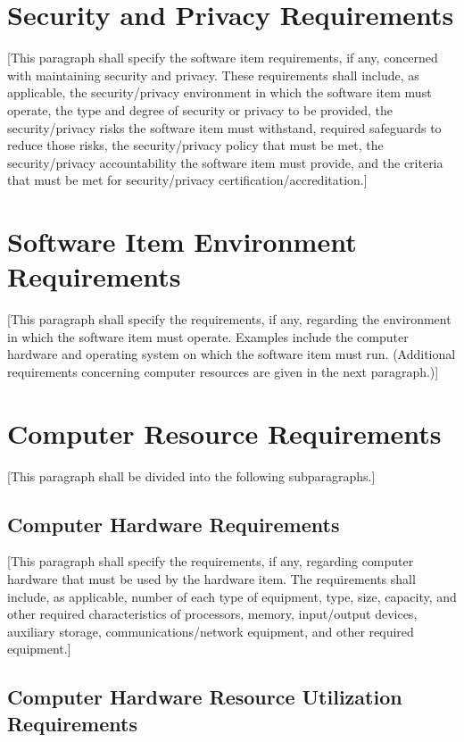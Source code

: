 \section{Security and Privacy Requirements\label{ref-016}}

[This paragraph shall specify the software item requirements, if any, concerned with maintaining security and privacy. These requirements shall include, as applicable, the security/privacy environment in which the software item must operate, the type and degree of security or privacy to be provided, the security/privacy risks the software item must withstand, required safeguards to reduce those risks, the security/privacy policy that must be met, the security/privacy accountability the software item must provide, and the criteria that must be met for security/privacy certification/accreditation.]

\section{Software Item Environment Requirements\label{ref-017}}

[This paragraph shall specify the requirements, if any, regarding the environment in which the software item must operate. Examples include the computer hardware and operating system on which the software item must run. (Additional requirements concerning computer resources are given in the next paragraph.)]

\section{Computer Resource Requirements\label{ref-018}}

[This paragraph shall be divided into the following subparagraphs.]

\subsection{Computer Hardware Requirements\label{ref-019}}

[This paragraph shall specify the requirements, if any, regarding computer hardware that must be used by the hardware item. The requirements shall include, as applicable, number of each type of equipment, type, size, capacity, and other required characteristics of processors, memory, input/output devices, auxiliary storage, communications/network equipment, and other required equipment.]

\subsection{Computer Hardware Resource Utilization Requirements\label{ref-020}}

